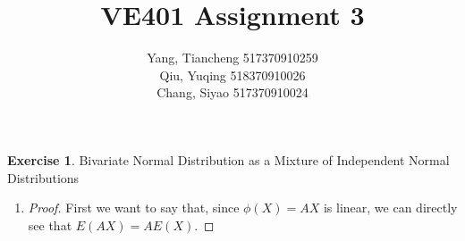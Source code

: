 \documentclass[12pt,a4paper]{article}
\theoremstyle{definition}
\newtheorem{exercise}{Exercise}
\begin{document}
\title{VE401 Assignment 3}
\author{Yang, Tiancheng 517370910259\\Qiu, Yuqing 518370910026\\Chang, Siyao 517370910024}

\maketitle

\newpage

\setcounter{exercise}{9}
\begin{exercise}
Bivariate Normal Distribution as a Mixture of Independent Normal Distributions
\end{exercise}
\begin{enumerate}[label=\roman*)]
    \item \begin{proof}
        First we want to say that, since $\phi (X)=AX$ is linear, we can directly see that $E(AX)=AE(X)$.


\end{proof}
\end{enumerate}
\end{document}

